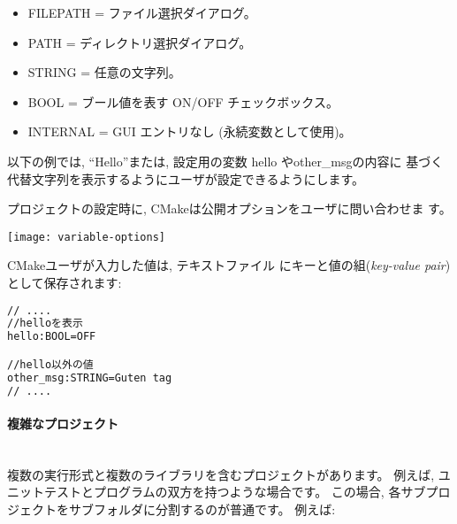 \documentclass[uplatex,11pt,a4paper,landscape,dvipdfmx]{jsarticle} %
\newcommand{\sectiontitle}[1]{\paragraph{#1} \ \\} %
\begin{document}
\begin{multicols}{2}
\begin{itemize}  
\item FILEPATH = ファイル選択ダイアログ。
\item PATH     = ディレクトリ選択ダイアログ。
\item STRING   = 任意の文字列。
\item BOOL     = ブール値を表す ON/OFF チェックボックス。
\item INTERNAL = GUI エントリなし (永続変数として使用)。
\end{itemize}

以下の例では, ``Hello''または, 設定用の変数 hello やother\_msgの内容に
基づく代替文字列を表示するようにユーザが設定できるようにします。



プロジェクトの設定時に, CMakeは公開オプションをユーザに問い合わせま
す。

\texttt{[image: variable-options]}

CMakeユーザが入力した値は, テキストファイル 
にキーと値の組({\em key-value pair})として保存されます:
\begin{lstlisting}[language=bash]
// ....
//helloを表示
hello:BOOL=OFF

//hello以外の値
other_msg:STRING=Guten tag
// ....
\end{lstlisting}

\sectiontitle{複雑なプロジェクト}

複数の実行形式と複数のライブラリを含むプロジェクトがあります。
例えば, ユニットテストとプログラムの双方を持つような場合です。
この場合, 各サブプロジェクトをサブフォルダに分割するのが普通です。
例えば: 
\vspace{\baselineskip} %
\noindent{}


\end{multicols}
\end{document}
